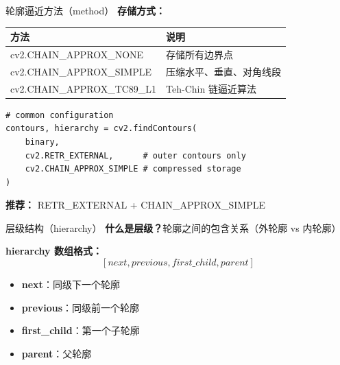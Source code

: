 \begin{frame}[fragile]{轮廓逼近方法（method）}
    \textbf{存储方式：}
    \begin{table}
        \centering
        \begin{tabular}{ll}
            \toprule
            \textbf{方法} & \textbf{说明} \\
            \midrule
            cv2.CHAIN\_APPROX\_NONE & 存储所有边界点 \\
            cv2.CHAIN\_APPROX\_SIMPLE & 压缩水平、垂直、对角线段 \\
            cv2.CHAIN\_APPROX\_TC89\_L1 & Teh-Chin 链逼近算法 \\
            \bottomrule
        \end{tabular}
    \end{table}

    \begin{lstlisting}[basicstyle=\ttfamily\scriptsize]
# common configuration
contours, hierarchy = cv2.findContours(
    binary,
    cv2.RETR_EXTERNAL,      # outer contours only
    cv2.CHAIN_APPROX_SIMPLE # compressed storage
)
    \end{lstlisting}

    \textbf{推荐：} RETR\_EXTERNAL + CHAIN\_APPROX\_SIMPLE

\end{frame}

\begin{frame}{层级结构（hierarchy）}
    \textbf{什么是层级？}轮廓之间的包含关系（外轮廓 vs 内轮廓）

    \textbf{hierarchy 数组格式：}
    $$
    [next, previous, first\_child, parent]
    $$

    \begin{itemize}
        \item \textbf{next}：同级下一个轮廓
        \item \textbf{previous}：同级前一个轮廓
        \item \textbf{first\_child}：第一个子轮廓
        \item \textbf{parent}：父轮廓
    \end{itemize}
\end{frame}

